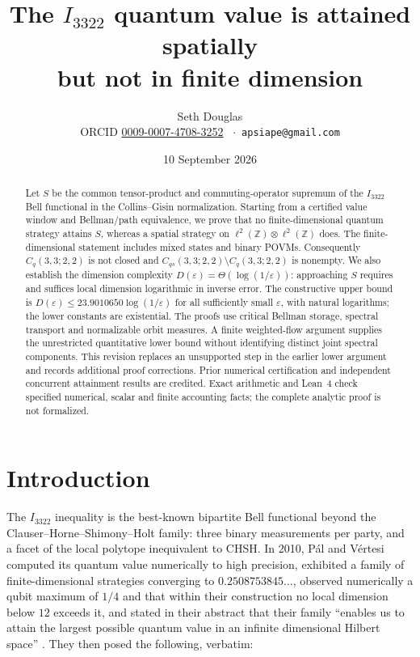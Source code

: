 \documentclass[11pt]{article}
\title{The $I_{3322}$ quantum value is attained spatially\\ but not in finite dimension}
\author{Seth Douglas\\
\small ORCID \href{https://orcid.org/0009-0007-4708-3252}{0009-0007-4708-3252}
\ $\cdot$\ \texttt{apsiape@gmail.com}}
\date{10 September 2026}
\theoremstyle{remark}
\newcommand{\Cq}{C_q}
\newcommand{\Cqs}{C_{qs}}
\newcommand{\eps}{\varepsilon}
\begin{document}
\maketitle

\begin{abstract}
Let $S$ be the common tensor-product and commuting-operator supremum
of the $I_{3322}$ Bell functional in the Collins--Gisin normalization.
Starting from a certified value window and Bellman/path equivalence,
we prove that no finite-dimensional quantum strategy attains $S$, whereas
a spatial strategy on $\ell^2(\mathbb Z)\otimes\ell^2(\mathbb Z)$ does.
The finite-dimensional statement includes mixed states and binary POVMs.
Consequently $\Cq(3,3;2,2)$ is not closed and
$\Cqs(3,3;2,2)\setminus\Cq(3,3;2,2)$ is nonempty.
We also establish the dimension complexity
$D(\eps)=\Theta(\log(1/\eps))$: approaching $S$ requires and suffices
local dimension logarithmic in inverse error.
The constructive upper bound is
$D(\eps)\le23.9010650\log(1/\eps)$ for all sufficiently small $\eps$,
with natural logarithms; the lower constants are existential.
The proofs use critical Bellman storage, spectral transport and
normalizable orbit measures. A finite weighted-flow argument supplies
the unrestricted quantitative lower bound without identifying distinct
joint spectral components. This revision replaces an unsupported step
in the earlier lower argument and records additional proof corrections.
Prior numerical certification and independent concurrent attainment
results are credited. Exact arithmetic and Lean~4 check specified
numerical, scalar and finite accounting facts; the complete analytic
proof is not formalized.
\end{abstract}

\section{Introduction}

The $I_{3322}$ inequality \cite{Froissart,CollinsGisin} is the best-known
bipartite Bell functional beyond the Clauser--Horne--Shimony--Holt family:
three binary measurements per party, and a facet of the local polytope
inequivalent to CHSH. In 2010, P\'al and V\'ertesi \cite{PalVertesi} computed
its quantum value numerically to high precision, exhibited a family of
finite-dimensional strategies converging to $0.2508753845\ldots$, observed
numerically a qubit maximum of $1/4$ and that within their construction no
local dimension below $12$ exceeds it, and stated in their abstract that
their family ``enables us to attain the largest possible quantum value in an
infinite dimensional Hilbert space'' \cite{PalVertesi}. They then posed the
following, verbatim:
\end{document}
